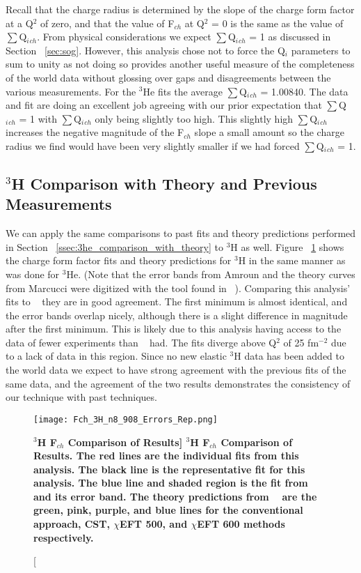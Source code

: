 Recall that the charge radius is determined by the slope of the charge form factor at a Q$^2$ of zero, and that the value of F$_{ch}$ at Q$^2$ = 0 is the same as the value of $\sum$Q$_i{_{ch}}$. From physical considerations we expect $\sum$Q$_i{_{ch}}$ = 1 as discussed in Section ~\ref{sec:sog}. However, this analysis chose not to force the Q$_i$ parameters to sum to unity as not doing so provides another useful measure of the completeness of the world data without glossing over gaps and disagreements between the various measurements. For the $^3$He fits the average $\sum$Q$_i{_{ch}}$ = 1.00840. The data and fit are doing an excellent job agreeing with our prior expectation that $\sum$Q$_i{_{ch}}$ = 1 with $\sum$Q$_i{_{ch}}$ only being slightly too high. This slightly high $\sum$Q$_i{_{ch}}$ increases the negative magnitude of the F$_{ch}$ slope a small amount so the charge radius we find would have been very slightly smaller if we had forced $\sum$Q$_i{_{ch}}$ = 1. 

\subsection{$^3$H Comparison with Theory and Previous Measurements}
\label{ssec:3h_comparison_with_theory}

We can apply the same comparisons to past fits and theory predictions performed in Section ~\ref{ssec:3he_comparison_with_theory} to $^3$H as well. Figure ~\ref{fig:3h_fch_theory} shows the charge form factor fits and theory predictions for $^3$H in the same manner as was done for $^3$He. (Note that the error bands from Amroun and the theory curves from Marcucci were digitized with the tool found in ~\cite{web_plot_digitizer}). Comparing this analysis' fits to ~\cite{Article:Amroun} they are in good agreement. The first minimum is almost identical, and the error bands overlap nicely, although there is a slight difference in magnitude after the first minimum. This is likely due to this analysis having access to the data of fewer experiments than ~\cite{Article:Amroun} had. The fits diverge above Q$^2$ of 25 fm$^{-2}$ due to a lack of data in this region. Since no new elastic $^3$H data has been added to the world data we expect to have strong agreement with the previous fits of the same data, and the agreement of the two results demonstrates the consistency of our technique with past techniques. 

\begin{figure}[!ht]
	\begin{center}
	\texttt{[image: Fch\_3H\_n8\_908\_Errors\_Rep.png]}
	\end{center}
	\caption[\bf{$^3$H F$_{ch}$ Comparison of Results}]{
	{\bf{$^3$H F$_{ch}$ Comparison of Results.}} The red lines are the individual fits from this analysis. The black line is the representative fit for this analysis. The blue line and shaded region is the fit from ~\cite{Article:Amroun} and its error band. The theory predictions from ~\cite{Article:Marcucci} are the green, pink, purple, and blue lines for the conventional approach, CST, $\chi$EFT 500, and $\chi$EFT 600 methods respectively.}
	\label{fig:3h_fch_theory}
\end{figure}

